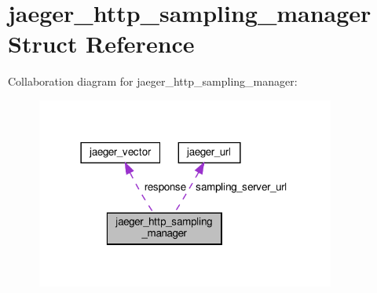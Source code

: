\hypertarget{structjaeger__http__sampling__manager}{}\section{jaeger\+\_\+http\+\_\+sampling\+\_\+manager Struct Reference}
\label{structjaeger__http__sampling__manager}


Collaboration diagram for jaeger\+\_\+http\+\_\+sampling\+\_\+manager\+:\nopagebreak
\begin{figure}[H]
\begin{center}
\leavevmode
\includegraphics[width=278pt]{structjaeger__http__sampling__manager__coll__graph}
\end{center}
\end{figure}
